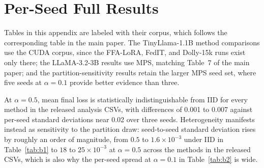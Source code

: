 \documentclass{ieeetj}
\begin{document}
\section{Per-Seed Full Results}
\label{app:perseed}
Tables in this appendix are labeled with their corpus, which follows the corresponding table in the main paper. The TinyLlama-1.1B method comparisons use the CUDA corpus, since the FFA-LoRA, FedIT, and Dolly-15k runs exist only there; the LLaMA-3.2-3B results use MPS, matching Table~7 of the main paper; and the partition-sensitivity results retain the larger MPS seed set, where five seeds at $\alpha{=}0.1$ provide better evidence than three.

At $\alpha{=}0.5$, mean final loss is statistically indistinguishable from IID for every method in the released analysis CSVs, with differences of 0.001 to 0.007 against per-seed standard deviations near 0.02 over three seeds. Heterogeneity manifests instead as sensitivity to the partition draw: seed-to-seed standard deviation rises by roughly an order of magnitude, from $0.5$ to $1.6 \times 10^{-3}$ under IID in Table~\ref{tab:b1} to $18$ to $25 \times 10^{-3}$ at $\alpha{=}0.5$ across the methods in the released CSVs, which is also why the per-seed spread at $\alpha{=}0.1$ in Table~\ref{tab:b2} is wide.
\end{document}

